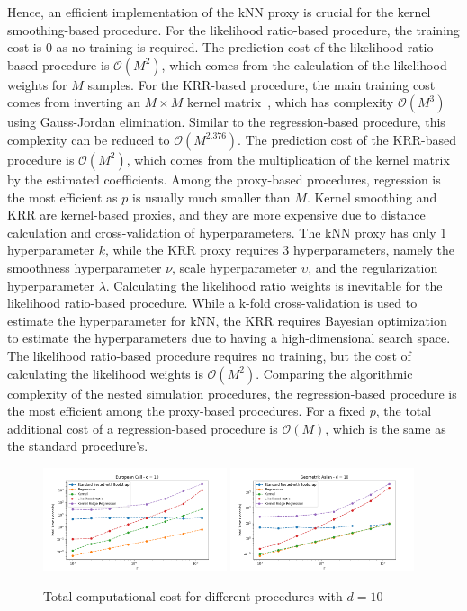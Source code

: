 Hence, an efficient implementation of the kNN proxy is crucial for the kernel smoothing-based procedure.
For the likelihood ratio-based procedure, the training cost is $0$ as no training is required.
The prediction cost of the likelihood ratio-based procedure is $\mathcal{O}(M^2)$, which comes from the calculation of the likelihood weights for $M$ samples.
For the KRR-based procedure, the main training cost comes from inverting an $M \times M$ kernel matrix~\citep{scholkopf2002learning}, which has complexity $\mathcal{O}(M^3)$ using Gauss-Jordan elimination.
Similar to the regression-based procedure, this complexity can be reduced to $\mathcal{O}(M^{2.376})$.
The prediction cost of the KRR-based procedure is $\mathcal{O}(M^2)$, which comes from the multiplication of the kernel matrix by the estimated coefficients.
Among the proxy-based procedures, regression is the most efficient as $p$ is usually much smaller than $M$. 
Kernel smoothing and KRR are kernel-based proxies, and they are more expensive due to distance calculation and cross-validation of hyperparameters. 
The kNN proxy has only 1 hyperparameter $k$, while the KRR proxy requires 3 hyperparameters, namely the smoothness hyperparameter $\nu$, scale hyperparameter $\upsilon$, and the regularization hyperparameter $\lambda$.
Calculating the likelihood ratio weights is inevitable for the likelihood ratio-based procedure. 
While a k-fold cross-validation is used to estimate the hyperparameter for kNN, the KRR requires Bayesian optimization~\citep{shahriari2015taking} to estimate the hyperparameters due to having a high-dimensional search space.
The likelihood ratio-based procedure requires no training, but the cost of calculating the likelihood weights is $\mathcal{O}(M^2)$.
Comparing the algorithmic complexity of the nested simulation procedures, the regression-based procedure is the most efficient among the proxy-based procedures.
For a fixed $p$, the total additional cost of a regression-based procedure is $\mathcal{O}(M)$, which is the same as the standard procedure's.


\begin{figure}[ht!]
    \centering
    \includegraphics[width=0.48\textwidth]{./project1/figures/figure11a.png}
    \includegraphics[width=0.48\textwidth]{./project1/figures/figure11b.png}
    \caption{Total computational cost for different procedures with $d=10$}
    \label{fig1:tcc}
\end{figure}

